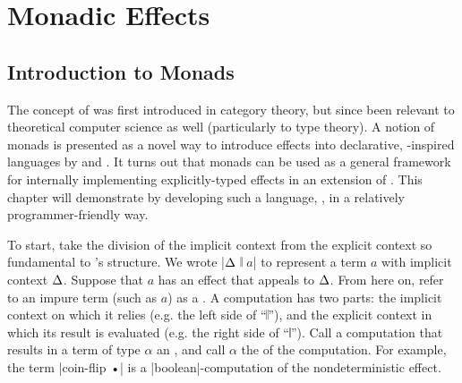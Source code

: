 \chapter{Monadic Effects}
\label{ch:ME}

\section{Introduction to Monads}
\label{sec:intro-monads}

The concept of  was first introduced in category theory, but since been relevant to theoretical computer science as well (particularly to type theory).
A notion of monads is presented as a novel way to introduce effects into declarative, \lc-inspired languages by \cite{MOGGI199155} and \cite{Plotkin2001}.
It turns out that monads can be used as a general framework for internally implementing explicitly-typed effects in an extension of \LangA.
This chapter will demonstrate by developing such a language, \LangC, in a relatively programmer-friendly way.

To start, take the division of the implicit context from the explicit context so fundamental to \LangB's structure.
We wrote \code|$\Delta$ 𝄁 $a$| to represent a term $a$ with implicit context $\Delta$.
Suppose that $a$ has an effect that appeals to $\Delta$.
From here on, refer to an impure term (such as $a$) as a .
A computation has two parts:
the implicit context on which it relies (e.g. the left side of ``$𝄁$''), and
the explicit context in which its result is evaluated (e.g. the right side of ``$𝄁$'').
Call a computation that results in a term of type $α$ an ,
and call $α$ the  of the computation.
For example, the \LangB term \code|coin-flip •| is a \code|boolean|-computation of the nondeterministic effect.


